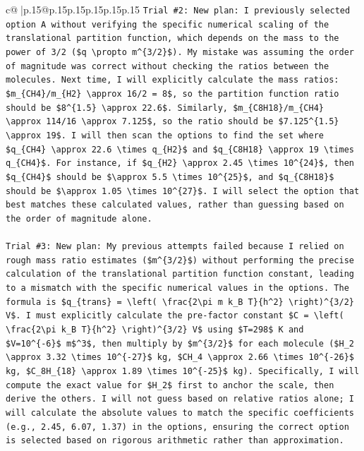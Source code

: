 \documentclass{article}
\begin{document}
{\begin{supertabular}{c@{$\;$}|p{.15\linewidth}@{}p{.15\linewidth}p{.15\linewidth}p{.15\linewidth}p{.15\linewidth}p{.15\linewidth}}
{{{\texttt{Trial \#2: New plan: I previously selected option A without verifying the specific numerical scaling of the translational partition function, which depends on the mass to the power of 3/2 (\$q \textbackslash{}propto m\^{}\{3/2\}\$). My mistake was assuming the order of magnitude was correct without checking the ratios between the molecules. Next time, I will explicitly calculate the mass ratios: \$m\_\{CH4\}/m\_\{H2\} \textbackslash{}approx 16/2 = 8\$, so the partition function ratio should be \$8\^{}\{1.5\} \textbackslash{}approx 22.6\$. Similarly, \$m\_\{C8H18\}/m\_\{CH4\} \textbackslash{}approx 114/16 \textbackslash{}approx 7.125\$, so the ratio should be \$7.125\^{}\{1.5\} \textbackslash{}approx 19\$. I will then scan the options to find the set where \$q\_\{CH4\} \textbackslash{}approx 22.6 \textbackslash{}times q\_\{H2\}\$ and \$q\_\{C8H18\} \textbackslash{}approx 19 \textbackslash{}times q\_\{CH4\}\$. For instance, if \$q\_\{H2\} \textbackslash{}approx 2.45 \textbackslash{}times 10\^{}\{24\}\$, then \$q\_\{CH4\}\$ should be \$\textbackslash{}approx 5.5 \textbackslash{}times 10\^{}\{25\}\$, and \$q\_\{C8H18\}\$ should be \$\textbackslash{}approx 1.05 \textbackslash{}times 10\^{}\{27\}\$. I will select the option that best matches these calculated values, rather than guessing based on the order of magnitude alone.} \\
\\ 
\texttt{Trial \#3: New plan: My previous attempts failed because I relied on rough mass ratio estimates (\$m\^{}\{3/2\}\$) without performing the precise calculation of the translational partition function constant, leading to a mismatch with the specific numerical values in the options. The formula is \$q\_\{trans\} = \textbackslash{}left( \textbackslash{}frac\{2\textbackslash{}pi m k\_B T\}\{h\^{}2\} \textbackslash{}right)\^{}\{3/2\} V\$. I must explicitly calculate the pre{-}factor constant \$C = \textbackslash{}left( \textbackslash{}frac\{2\textbackslash{}pi k\_B T\}\{h\^{}2\} \textbackslash{}right)\^{}\{3/2\} V\$ using \$T=298\$ K and \$V=10\^{}\{{-}6\}\$ m\$\^{}3\$, then multiply by \$m\^{}\{3/2\}\$ for each molecule (\$H\_2 \textbackslash{}approx 3.32 \textbackslash{}times 10\^{}\{{-}27\}\$ kg, \$CH\_4 \textbackslash{}approx 2.66 \textbackslash{}times 10\^{}\{{-}26\}\$ kg, \$C\_8H\_\{18\} \textbackslash{}approx 1.89 \textbackslash{}times 10\^{}\{{-}25\}\$ kg). Specifically, I will compute the exact value for \$H\_2\$ first to anchor the scale, then derive the others. I will not guess based on relative ratios alone; I will calculate the absolute values to match the specific coefficients (e.g., 2.45, 6.07, 1.37) in the options, ensuring the correct option is selected based on rigorous arithmetic rather than approximation.} \\
}}}
\end{supertabular}}
\end{document}
